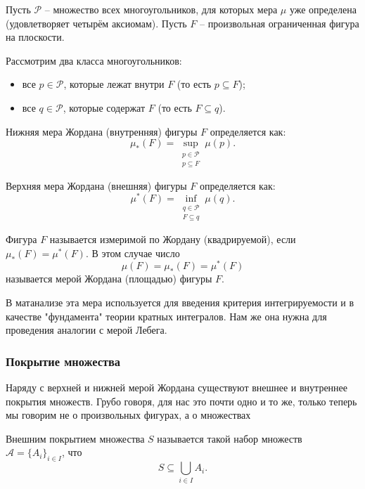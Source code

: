 Пусть $\mathcal{P}$ -- множество всех многоугольников, для которых мера $\mu$ уже определена (удовлетворяет четырём аксиомам). Пусть $F$ -- произвольная ограниченная фигура на плоскости.

Рассмотрим два класса многоугольников:
\begin{itemize}
    \item все $p \in \mathcal{P}$, которые лежат внутри $F$ (то есть $p \subseteq F$);
    \item все $q \in \mathcal{P}$, которые содержат $F$ (то есть $F \subseteq q$).
\end{itemize}

\begin{definition}
Нижняя мера Жордана (внутренняя) фигуры $F$ определяется как:
\[
\mu_*(F) = \sup_{\substack{p \in \mathcal{P} \\ p \subseteq F}} \mu(p).
\]
\end{definition}

\begin{definition}
Верхняя мера Жордана (внешняя) фигуры $F$ определяется как:
\[
\mu^*(F) = \inf_{\substack{q \in \mathcal{P} \\ F \subseteq q}} \mu(q).
\]
\end{definition}

\begin{definition}
Фигура $F$ называется измеримой по Жордану (квадрируемой), если $\mu_*(F) = \mu^*(F)$. В этом случае число
\[
\mu(F) = \mu_*(F) = \mu^*(F)
\]
называется мерой Жордана (площадью) фигуры $F$.
\end{definition}


В матанализе эта мера используется для введения критерия интегрируемости и в качестве "фундамента" теории кратных интегралов. Нам же она нужна для проведения аналогии с мерой Лебега.

\subsubsection{Покрытие множества}

Наряду с верхней и нижней мерой Жордана существуют внешнее и внутреннее покрытия множеств. Грубо говоря, для нас это почти одно и то же, только теперь мы говорим не о произвольных фигурах, а о множествах

\begin{definition}
Внешним покрытием множества $S$ называется такой набор множеств $\mathcal{A} = \{A_i\}_{i \in I}$, что
\[
S \subseteq \bigcup_{i \in I} A_i.
\]
\end{definition}

